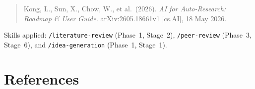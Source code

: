 \documentclass[12pt, a4paper]{article}
\begin{document}
\begin{quote}
  Kong, L., Sun, X., Chow, W., et al.\ (2026).
  \emph{AI for Auto-Research: Roadmap \& User Guide.}
  arXiv:2605.18661v1 [cs.AI], 18 May 2026.
\end{quote}

Skills applied: \texttt{/literature-review} (Phase~1, Stage~2),
\texttt{/peer-review} (Phase~3, Stage~6), and
\texttt{/idea-generation} (Phase~1, Stage~1).

\section*{References}
\end{document}
